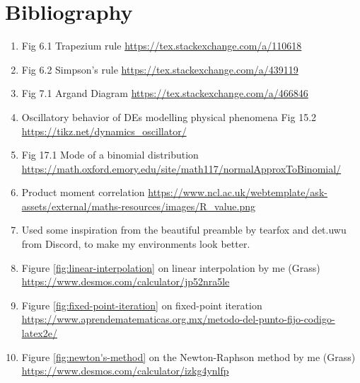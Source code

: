 \documentclass[oneside]{book}
\begin{document}
\chapter{Bibliography}
\begin{enumerate}
  \item Fig 6.1 Trapezium rule \url{https://tex.stackexchange.com/a/110618}
  \item Fig 6.2 Simpson's rule \url{https://tex.stackexchange.com/a/439119}
  \item Fig 7.1 Argand Diagram \url{https://tex.stackexchange.com/a/466846}
  \item Oscillatory behavior of DEs modelling physical phenomena Fig 15.2 \url{https://tikz.net/dynamics_oscillator/}
  \item Fig 17.1 Mode of a binomial distribution \url{https://math.oxford.emory.edu/site/math117/normalApproxToBinomial/}
  \item Product moment correlation \url{https://www.ncl.ac.uk/webtemplate/ask-assets/external/maths-resources/images/R_value.png}
  \item Used some inspiration from the beautiful preamble by tearfox and det.uwu from Discord, to make my environments look better.
  \item Figure \ref{fig:linear-interpolation} on linear interpolation by me (Grass) \url{https://www.desmos.com/calculator/jp52nra5le}
  \item Figure \ref{fig:fixed-point-iteration} on  fixed-point iteration \url{https://www.aprendematematicas.org.mx/metodo-del-punto-fijo-codigo-latex2e/}
  \item Figure \ref{fig:newton's-method} on the Newton-Raphson method by me (Grass) \url{https://www.desmos.com/calculator/izkg4ynlfp}
\end{enumerate}
\end{document}
